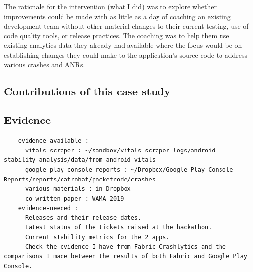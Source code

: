 The rationale for the intervention (what I did) was to explore whether improvements could be made with as little as a day of coaching an existing development team without other material changes to their current testing, use of code quality tools, or release practices. The coaching was to help them use existing analytics data they already had available where the focus would be on establishing changes they could make to the application's source code to address various crashes and ANRs.

\subsection*{Contributions of this case study}




\subsection*{Evidence}
  \begin{verbatim}
    evidence available :
      vitals-scraper : ~/sandbox/vitals-scraper-logs/android-stability-analysis/data/from-android-vitals
      google-play-console-reports : ~/Dropbox/Google Play Console Reports/reports/catrobat/pocketcode/crashes
      various-materials : in Dropbox
      co-written-paper : WAMA 2019
    evidence-needed : 
      Releases and their release dates.
      Latest status of the tickets raised at the hackathon.
      Current stability metrics for the 2 apps.
      Check the evidence I have from Fabric Crashlytics and the comparisons I made between the results of both Fabric and Google Play Console.
  \end{verbatim}



